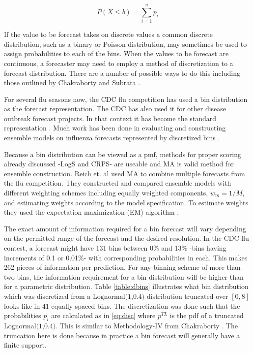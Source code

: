 \documentclass[11pt,notitlepage]{isuthesis}
\begin{document}
\begin{equation}
\label{eq:bcdf}
  P(X \leq b) = \sum_{i=1}^n p_i
\end{equation}


If the value to be forecast takes on discrete values a common discrete 
distribution, such as a binary or Poisson distribution, may sometimes be used to 
assign probabilities to each of the bins. When the values to be forecast are
continuous, a forecaster may need to employ a method of discretization to a 
forecast distribution. There are a number of possible ways to do this including
those outlined by Chakraborty and Subrata \cite[]{chakraborty2015generating}.

For several flu seasons now, the CDC flu competition has used a bin distribution 
as the forecast 
representation. The CDC has also used it for other disease outbreak
forecast projects.
In that context it has become the standard representation 
\cite[]{brooks2020comparing}. Much work has been done in evaluating 
and constructing ensemble models on influenza forecasts represented by 
discretized bins 
\cite[]{mcgowan2019collaborative, mcandrew2019adaptively,reich2019collaborative}. 

Because a bin distribution can be viewed as a pmf, methods for proper scoring 
already 
discussed -LogS and CRPS- are useable and MA is valid method for ensemble 
construction. Reich et. al used MA to combine multiple forecasts from the flu 
competition. They constructed and compared ensemble models with different 
weighting
schemes including equally weighted components, $w_m = 1/M$,
and estimating weights
according to the model specification. To estimate weights they used the 
expectation maximization (EM) algorithm 
\cite[see
supplementary material within for details]{reich2019accuracy}.

The exact amount of information required for a bin forecast will 
vary depending on the permitted range of the forecast and the desired 
resolution. 
In the CDC flu contest, a forecast might have 131 bins between 0\% and 13\% 
-bins having increments of 0.1 or 0.01\%- with 
corresponding probabilities in each. This makes 262 pieces of information per
prediction. For any binning scheme of more than two bins, the information 
requirement for a bin distribution will be higher than for a parametric 
distribution.
Table \ref{table:dbins} illustrates what bin distribution which was discretized 
from a 
$\mbox{Lognormal(1,0.4)}$ distribution truncated over $[0,8]$
looks like in 41 equally spaced bins. The discretization was done
such that the probabilities $p_i$ are calculated as in \eqref{eq:disc}
where $p^{TL}$ is the pdf of a truncated $\mbox{Lognormal(1,0.4)}$. This is 
similar
to Methodology-IV from Chakraborty 
\cite[]{chakraborty2015generating,kemp2004classes}. The truncation here is done
because in practice a bin forecast will generally have a finite support.
\end{document}
